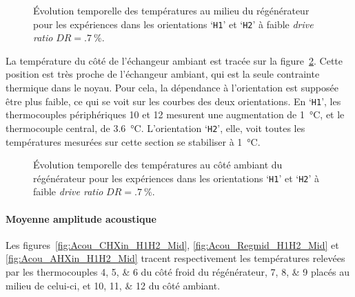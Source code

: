 \begin{figure}[!ht]
    \centering
    
    \caption{\'Evolution temporelle des températures au milieu du régénérateur pour les expériences dans les orientations `\texttt{H1}' et `\texttt{H2}' à faible \textit{drive ratio} $DR=\qty{.7}{\percent}$.}
    \label{fig:Acou_Regmid_H1H2_Low}
\end{figure}

La température du côté de l'échangeur ambiant est tracée sur la figure~\ref{fig:Acou_AHXin_H1H2_Low}. Cette position est très proche de l'échangeur ambiant, qui est la seule contrainte thermique dans le noyau. Pour cela, la dépendance à l'orientation est supposée être plus faible, ce qui se voit sur les courbes des deux orientations. En `\texttt{H1}', les thermocouples périphériques 10 et 12 mesurent une augmentation de \qty{1}{\degreeCelsius}, et le thermocouple central, de \qty{3.6}{\degreeCelsius}. L'orientation `\texttt{H2}', elle, voit toutes les températures mesurées sur cette section se stabiliser à \qty{1}{\degreeCelsius}.

\begin{figure}[!ht]
    \centering
    
    \caption{\'Evolution temporelle des températures au côté ambiant du régénérateur pour les expériences dans les orientations `\texttt{H1}' et `\texttt{H2}' à faible \textit{drive ratio} $DR=\qty{.7}{\percent}$.}
    \label{fig:Acou_AHXin_H1H2_Low}
\end{figure}

\paragraph{Moyenne amplitude acoustique}
Les figures~\ref{fig:Acou_CHXin_H1H2_Mid}, \ref{fig:Acou_Regmid_H1H2_Mid} et \ref{fig:Acou_AHXin_H1H2_Mid} tracent respectivement les températures relevées par les thermocouples \numlist{4;5;6} du côté froid du régénérateur, \numlist{7;8;9} placés au milieu de celui-ci, et \numlist{10;11;12} du côté ambiant.

